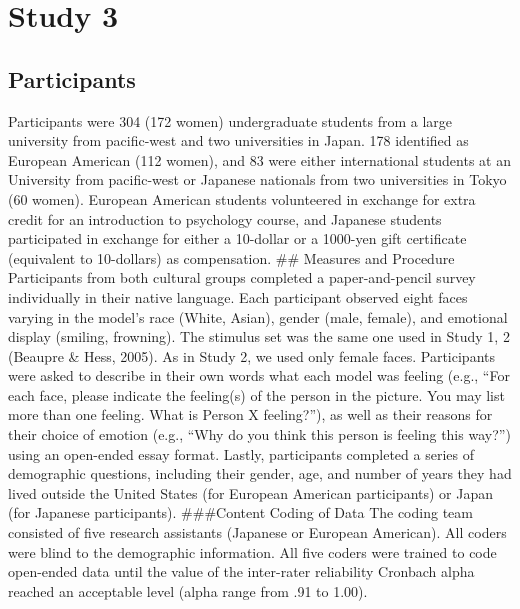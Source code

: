 \documentclass[english,man]{apa6}
\begin{document}
\section{Study 3}\label{study-3}

\subsection{Participants}\label{participants-2}

Participants were 304 (172 women) undergraduate students from a large
university from pacific-west and two universities in Japan. 178
identified as European American (112 women), and 83 were either
international students at an University from pacific-west or Japanese
nationals from two universities in Tokyo (60 women). European American
students volunteered in exchange for extra credit for an introduction to
psychology course, and Japanese students participated in exchange for
either a 10-dollar or a 1000-yen gift certificate (equivalent to
10-dollars) as compensation. \#\# Measures and Procedure Participants
from both cultural groups completed a paper-and-pencil survey
individually in their native language. Each participant observed eight
faces varying in the model's race (White, Asian), gender (male, female),
and emotional display (smiling, frowning). The stimulus set was the same
one used in Study 1, 2 (Beaupre \& Hess, 2005). As in Study 2, we used
only female faces. Participants were asked to describe in their own
words what each model was feeling (e.g., \enquote{For each face, please
indicate the feeling(s) of the person in the picture. You may list more
than one feeling. What is Person X feeling?}), as well as their reasons
for their choice of emotion (e.g., \enquote{Why do you think this person
is feeling this way?}) using an open-ended essay format. Lastly,
participants completed a series of demographic questions, including
their gender, age, and number of years they had lived outside the United
States (for European American participants) or Japan (for Japanese
participants). \#\#\#Content Coding of Data The coding team consisted of
five research assistants (Japanese or European American). All coders
were blind to the demographic information. All five coders were trained
to code open-ended data until the value of the inter-rater reliability
Cronbach alpha reached an acceptable level (alpha range from .91 to
1.00).
\end{document}
